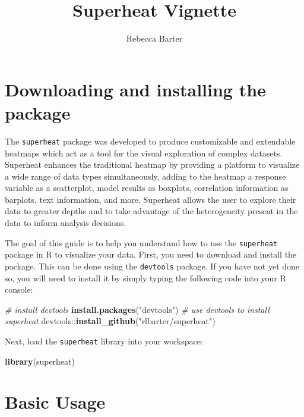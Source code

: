 \documentclass[]{book}
\title{Superheat Vignette}
\author{Rebecca Barter}
\date{}
\newenvironment{Shaded}{\begin{snugshade}}{\end{snugshade}}
\newcommand{\KeywordTok}[1]{\textcolor[rgb]{0.13,0.29,0.53}{\textbf{{#1}}}}
\newcommand{\StringTok}[1]{\textcolor[rgb]{0.31,0.60,0.02}{{#1}}}
\newcommand{\CommentTok}[1]{\textcolor[rgb]{0.56,0.35,0.01}{\textit{{#1}}}}
\newcommand{\NormalTok}[1]{{#1}}
\theoremstyle{definition}
\theoremstyle{definition}
\theoremstyle{remark}
\begin{document}
\maketitle

{
\setcounter{tocdepth}{1}
\tableofcontents
}
\chapter{Downloading and installing the
package}\label{downloading-and-installing-the-package}

The \texttt{superheat} package was developed to produce customizable and
extendable heatmaps which act as a tool for the visual exploration of
complex datasets. Superheat enhances the traditional heatmap by
providing a platform to visualize a wide range of data types
simultaneously, adding to the heatmap a response variable as a
scatterplot, model results as boxplots, correlation information as
barplots, text information, and more. Superheat allows the user to
explore their data to greater depths and to take advantage of the
heterogeneity present in the data to inform analysis decisions.

The goal of this guide is to help you understand how to use the
\texttt{superheat} package in R to visualize your data. First, you need
to download and install the package. This can be done using the
\texttt{devtools} package. If you have not yet done so, you will need to
install it by simply typing the following code into your R console:

\begin{Shaded}
\begin{Highlighting}[]
\CommentTok{# install devtools}
\KeywordTok{install.packages}\NormalTok{(}\StringTok{"devtools"}\NormalTok{)}
\CommentTok{# use devtools to install superheat}
\NormalTok{devtools::}\KeywordTok{install_github}\NormalTok{(}\StringTok{"rlbarter/superheat"}\NormalTok{)}
\end{Highlighting}
\end{Shaded}

Next, load the \texttt{superheat} library into your workspace:

\begin{Shaded}
\begin{Highlighting}[]
\KeywordTok{library}\NormalTok{(superheat)}
\end{Highlighting}
\end{Shaded}

\chapter{Basic Usage}\label{basic-usage}
\end{document}
